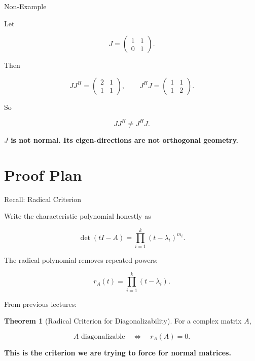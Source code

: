 \documentclass[10pt]{beamer}
\theoremstyle{definition}
\newtheorem{thm}{Theorem}[section]
\newcommand{\x}[1]{\alert{\textbf{#1}}}
\begin{document}
\begin{frame}{Non-Example}

Let

$$
J=\begin{pmatrix}1&1\\0&1\end{pmatrix}.
$$

\vfill

Then

$$
JJ^H
=\begin{pmatrix}2&1\\1&1\end{pmatrix},
\qquad
J^HJ
=\begin{pmatrix}1&1\\1&2\end{pmatrix}.
$$

\vfill

So

$$
JJ^H\ne J^HJ.
$$

\vfill

\begin{center}
\x{$J$ is not normal. Its eigen-directions are not orthogonal geometry.}
\end{center}

\end{frame}

\section{Proof Plan}

\begin{frame}[shrink=8]{Recall: Radical Criterion}

Write the characteristic polynomial honestly as

$$
\det(tI-A)
=\prod_{i=1}^k(t-\lambda_i)^{m_i}.
$$

\vfill

The radical polynomial removes repeated powers:

$$
r_A(t)=\prod_{i=1}^k(t-\lambda_i).
$$

\vfill

From previous lectures:

\begin{thm}[Radical Criterion for Diagonalizability]
For a complex matrix $A$,

$$
\boxed{
A\text{ diagonalizable}
\quad\Longleftrightarrow\quad
r_A(A)=0.
}
$$
\end{thm}

\vfill

\begin{center}
\x{This is the criterion we are trying to force for normal matrices.}
\end{center}

\end{frame}
\end{document}
